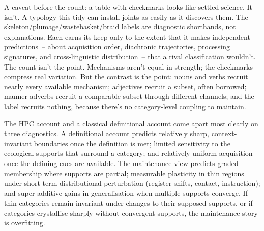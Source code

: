 A caveat before the count: a table with checkmarks looks like settled science. It isn't. A typology this tidy can install joints as easily as it discovers them. The skeleton/plumage/wastebasket/braid labels are diagnostic shorthands, not explanations. Each earns its keep only to the extent that it makes independent predictions~-- about acquisition order, diachronic trajectories, processing signatures, and cross-linguistic distribution~-- that a rival classification wouldn't. The count isn't the point. Mechanisms aren't equal in strength; the checkmarks compress real variation. But the contrast is the point: nouns and verbs recruit nearly every available mechanism; adjectives recruit a subset, often borrowed; manner adverbs recruit a comparable subset through different channels; and the  label recruits nothing, because there's no category-level coupling to maintain.

The HPC account and a classical definitional account come apart most clearly on three diagnostics. A definitional account predicts relatively sharp, context-invariant boundaries once the definition is met; limited sensitivity to the ecological supports that surround a category; and relatively uniform acquisition once the defining cues are available. The maintenance view predicts graded membership where supports are partial; measurable plasticity in thin regions under short-term distributional perturbation (register shifts, contact, instruction); and super-additive gains in generalisation when multiple supports converge. If thin categories remain invariant under changes to their supposed supports, or if categories crystallise sharply without convergent supports, the maintenance story is overfitting.

